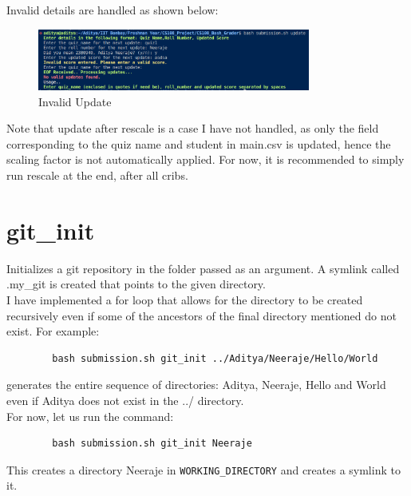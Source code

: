 \documentclass{article}
\begin{document}
    Invalid details are handled as shown below:
    \begin{figure}[htbp]
        \centering
        \includegraphics[width=0.8\textwidth]{Handling Invalid Details for Update.png}
        \caption{Invalid Update}
        \label{fig:invalid_update}
    \end{figure}

    Note that update after rescale is a case I have not handled, as only the field corresponding to the quiz name and student in main.csv is updated, hence the scaling factor is not automatically applied. For now, it is recommended to simply run rescale at the end, after all cribs.

    \section{git\_init}
    Initializes a git repository in the folder passed as an argument. A symlink called .my\_git is created that points to the given directory.\\
    I have implemented a for loop that allows for the directory to be created recursively even if some of the ancestors of the final directory mentioned do not exist. For example:
    \begin{lstlisting}
        bash submission.sh git_init ../Aditya/Neeraje/Hello/World
    \end{lstlisting}
    generates the entire sequence of directories: Aditya, Neeraje, Hello and World even if Aditya does not exist in the ../ directory.\\

    For now, let us run the command:
    \begin{lstlisting}
        bash submission.sh git_init Neeraje
    \end{lstlisting}
    This creates a directory Neeraje in \texttt{WORKING\_DIRECTORY} and creates a symlink to it.\\
\end{document}
